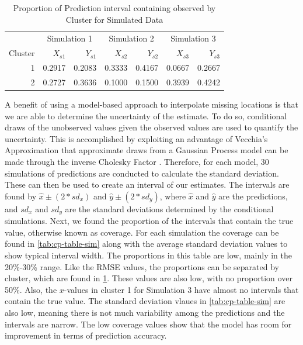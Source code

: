 \documentclass[12pt]{article}
\begin{document}
\begin{table}

\caption{\label{tab:cp-sim-table}Proportion of Prediction interval containing observed by Cluster for Simulated Data}
\centering
\begin{tabular}[t]{rrrrrrr}
\toprule
\multicolumn{1}{c}{ } & \multicolumn{2}{c}{Simulation 1} & \multicolumn{2}{c}{Simulation 2} & \multicolumn{2}{c}{Simulation 3} \\
\cmidrule(l{3pt}r{3pt}){2-3} \cmidrule(l{3pt}r{3pt}){4-5} \cmidrule(l{3pt}r{3pt}){6-7}
Cluster & $X_{s1}$ & $Y_{s1}$ & $X_{s2}$ & $Y_{s2}$ & $X_{s3}$ & $Y_{s3}$\\
\midrule
1 & 0.2917 & 0.2083 & 0.3333 & 0.4167 & 0.0667 & 0.2667\\
2 & 0.2727 & 0.3636 & 0.1000 & 0.1500 & 0.3939 & 0.4242\\
\bottomrule
\end{tabular}
\end{table}

A benefit of using a model-based approach to interpolate missing
locations is that we are able to determine the uncertainty of the
estimate. To do so, conditional draws of the unobserved values given the
observed values are used to quantify the uncertainty. This is
accomplished by exploiting an advantage of Vecchia's Approximation that
approximate draws from a Gaussian Process model can be made through the
inverse Cholesky Factor \citep{guinness_permutation_2018}. Therefore,
for each model, 30 simulations of predictions are conducted to calculate
the standard deviation. These can then be used to create an interval of
our estimates. The intervals are found by \(\hat{x} \pm (2*sd_x)\) and
\(\hat{y} \pm (2*sd_y)\), where \(\hat{x}\) and \(\hat{y}\) are the
predictions, and \(sd_x\) and \(sd_y\) are the standard deviations
determined by the conditional simulations. Next, we found the proportion
of the intervals that contain the true value, otherwise known as
coverage. For each simulation the coverage can be found in
\cref{tab:cp-table-sim} along with the average standard deviation values
to show typical interval width. The proportions in this table are low,
mainly in the 20\%-30\% range. Like the RMSE values, the proportions can
be separated by cluster, which are found in \cref{tab:cp-sim-table}.
These values are also low, with no proportion over 50\%. Also, the
\(x\)-values in cluster 1 for Simulation 3 have almost no intervals that
contain the true value. The standard deviation vlaues in
\cref{tab:cp-table-sim} are also low, meaning there is not much
variability among the predictions and the intervals are narrow. The low
coverage values show that the model has room for improvement in terms of
prediction accuracy.
\end{document}

